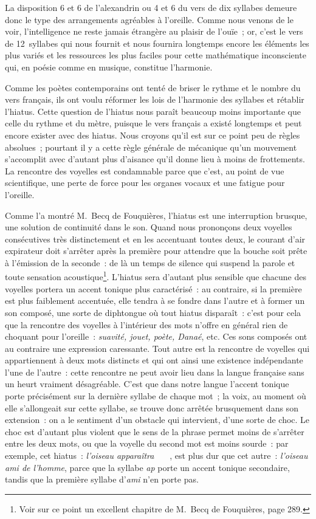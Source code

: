 \documentclass[french,twoside]{book} %
\begin{document}
\noindent La disposition 6 et 6 de l’alexandrin ou 4 et 6 du vers de dix syllabes demeure donc le type des arrangements agréables à l’oreille. Comme nous venons de le voir, l’intelligence ne reste jamais étrangère au plaisir de l’ouïe ; or, c’est le vers de 12 syllabes qui nous fournit et nous fournira longtemps encore les éléments les plus variés et  les ressources les plus faciles pour cette mathématique inconsciente qui, en poésie comme en musique, constitue l’harmonie.\par
\par
Comme les poètes contemporains ont tenté de briser le rythme et le nombre du vers français, ils ont voulu réformer les lois de l’harmonie des syllabes et rétablir l’hiatus. Cette question de l’hiatus nous paraît beaucoup moins importante que celle du rythme et du mètre, puisque le vers français a existé longtemps et peut encore exister avec des hiatus. Nous croyons qu’il est sur ce point peu de règles absolues ; pourtant il y a cette règle générale de mécanique qu’un mouvement s’accomplit avec d’autant plus d’aisance qu’il donne lieu à moins de frottements. La rencontre des voyelles est condamnable parce que c’est, au point de vue scientifique, une perte de force pour les organes vocaux et une fatigue pour l’oreille.\par
Comme l’a montré M. Becq de Fouquières, l’hiatus est une interruption brusque, une solution de continuité dans le son. Quand nous prononçons deux voyelles consécutives très distinctement et en les accentuant toutes deux, le courant d’air expirateur doit s’arrêter après la première pour attendre que la bouche soit prête à l’émission de la seconde : de là un temps de silence qui suspend la parole et toute sensation acoustique\footnote{Voir sur ce point un excellent chapitre de M. Becq de Fouquières, page 289.}. L’hiatus sera d’autant plus sensible que chacune des voyelles portera un accent tonique plus caractérisé : au contraire, si la première est plus  faiblement accentuée, elle tendra à se fondre dans l’autre et à former un son composé, une sorte de diphtongue où tout hiatus disparaît : c’est pour cela que la rencontre des voyelles à l’intérieur des mots n’offre en général rien de choquant pour l’oreille : \emph{suavité, jouet, poète, Danaé}, etc. Ces sons composés ont au contraire une expression caressante. Tout autre est la rencontre de voyelles qui appartiennent à deux mots distincts et qui ont ainsi une existence indépendante l’une de l’autre : cette rencontre ne peut avoir lieu dans la langue française sans un heurt vraiment désagréable. C’est que dans notre langue l’accent tonique porte précisément sur la dernière syllabe de chaque mot ; la voix, au moment où elle s’allongeait sur cette syllabe, se trouve donc arrêtée brusquement dans son extension : on a le sentiment d’un obstacle qui intervient, d’une sorte de choc. Le choc est d’autant plus violent que le sens de la phrase permet moins de s’arrêter entre les deux mots, ou que la voyelle du second mot est moins sourde : par exemple, cet hiatus : \emph{l’oiseau apparaîtra}    , est plus dur que cet autre : \emph{l’oiseau ami de l’homme}, parce que la syllabe \emph{ap} porte un accent tonique secondaire, tandis que la première syllabe d’\emph{ami} n’en porte pas.\par
\end{document}
